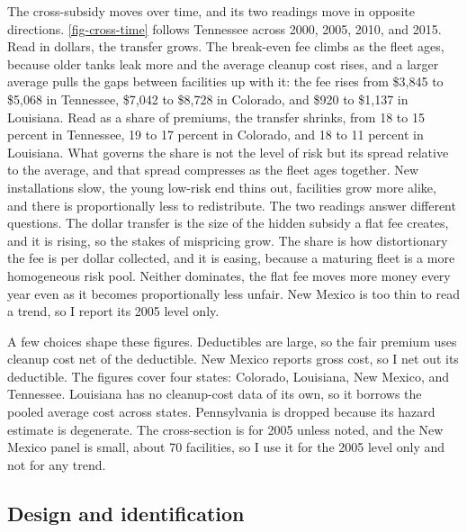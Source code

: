 \documentclass[
  12pt,
]{article}
\begin{document}
The cross-subsidy moves over time, and its two readings move in opposite
directions. \autoref{fig-cross-time} follows Tennessee across 2000,
2005, 2010, and 2015. Read in dollars, the transfer grows. The
break-even fee climbs as the fleet ages, because older tanks leak more
and the average cleanup cost rises, and a larger average pulls the gaps
between facilities up with it: the fee rises from \$3,845 to \$5,068 in
Tennessee, \$7,042 to \$8,728 in Colorado, and \$920 to \$1,137 in
Louisiana. Read as a share of premiums, the transfer shrinks, from 18 to
15 percent in Tennessee, 19 to 17 percent in Colorado, and 18 to 11
percent in Louisiana. What governs the share is not the level of risk
but its spread relative to the average, and that spread compresses as
the fleet ages together. New installations slow, the young low-risk end
thins out, facilities grow more alike, and there is proportionally less
to redistribute. The two readings answer different questions. The dollar
transfer is the size of the hidden subsidy a flat fee creates, and it is
rising, so the stakes of mispricing grow. The share is how distortionary
the fee is per dollar collected, and it is easing, because a maturing
fleet is a more homogeneous risk pool. Neither dominates, the flat fee
moves more money every year even as it becomes proportionally less
unfair. New Mexico is too thin to read a trend, so I report its 2005
level only.

A few choices shape these figures. Deductibles are large, so the fair
premium uses cleanup cost net of the deductible. New Mexico reports
gross cost, so I net out its deductible. The figures cover four states:
Colorado, Louisiana, New Mexico, and Tennessee. Louisiana has no
cleanup-cost data of its own, so it borrows the pooled average cost
across states. Pennsylvania is dropped because its hazard estimate is
degenerate. The cross-section is for 2005 unless noted, and the New
Mexico panel is small, about 70 facilities, so I use it for the 2005
level only and not for any trend.

\subsection{Design and identification}\label{design-and-identification}
\end{document}
